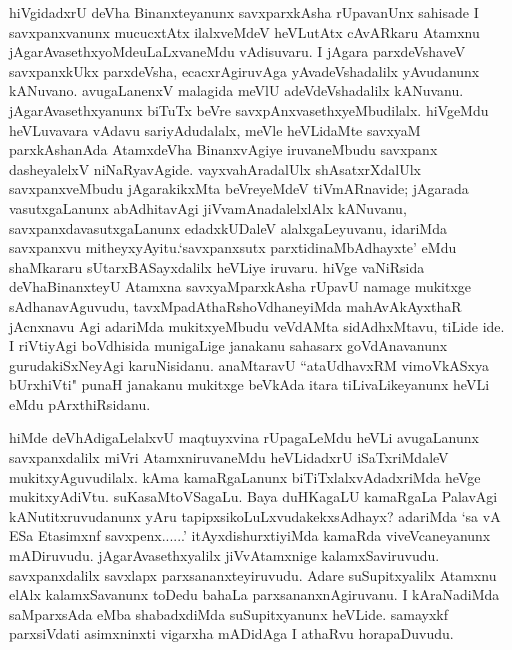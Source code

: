 \begin{artha}
hiVgidadxrU deVha Binanxteyanunx savxparxkAsha rUpavanUnx sahisade I savxpanxvanunx mucucxtAtx ilalxveMdeV heVLutAtx cAvARkaru Atamxnu jAgarAvasethxyoMdeuLaLxvaneMdu vAdisuvaru. I jAgara parxdeVshaveV savxpanxkUkx parxdeVsha, ecacxrAgiruvAga yAvadeVshadalilx yAvudanunx kANuvano. avugaLanenxV malagida meVlU adeVdeVshadalilx kANuvanu. jAgarAvasethxyanunx biTuTx beVre savxpAnxvasethxyeMbudilalx. hiVgeMdu heVLuvavara vAdavu sariyAdudalalx, meVle heVLidaMte savxyaM parxkAshanAda AtamxdeVha BinanxvAgiye iruvaneMbudu savxpanx dasheyalelxV niNaRyavAgide. vayxvahAradalUlx shAsatxrXdalUlx savxpanxveMbudu jAgarakikxMta beVreyeMdeV tiVmARnavide; jAgarada vasutxgaLanunx abAdhitavAgi jiVvamAnadalelxlAlx kANuvanu, savxpanxdavasutxgaLanunx edadxkUDaleV alalxgaLeyuvanu, idariMda savxpanxvu mitheyxyAyitu.\break `savxpanxsutx parxtidinaMbAdhayxte' eMdu shaMkararu sUtarxBASayxdalilx heVLiye iruvaru. hiVge vaNiRsida deVhaBinanxteyU Atamxna savxyaMparxkAsha rUpavU namage mukitxge sAdhanavAguvudu, tavxMpadAthaRshoVdhaneyiMda mahAvAkAyxthaR jAcnxnavu Agi adariMda mukitxyeMbudu veVdAMta sidAdhxMtavu, tiLide ide. I riVtiyAgi boVdhisida munigaLige janakanu sahasarx goVdAnavanunx gurudakiSxNeyAgi karuNisidanu. anaMtaravU ``ataUdhavxRM vimoVkASxya bUrxhiVti" punaH janakanu mukitxge beVkAda itara tiLivaLikeyanunx heVLi eMdu pArxthiRsidanu. 
\end{artha}%


\begin{artha}
hiMde deVhAdigaLelalxvU maqtuyxvina rUpagaLeMdu heVLi avugaLanunx savxpanxdalilx miVri AtamxniruvaneMdu heVLidadxrU iSaTxriMdaleV mukitxyAguvudilalx. kAma kamaRgaLanunx biTiTxlalxvAdadxriMda heVge mukitxyAdiVtu. suKasaMtoVSagaLu. Baya duHKagaLU kamaRgaLa PalavAgi kANutitxruvudanunx yAru tapipxsikoLuLxvudakekx\break sAdhayx? adariMda `sa vA ESa Etasimxnf savxpenx......' itAyxdi\break shurxtiyiMda kamaRda viveVcaneyanunx mADiruvudu. jAgarAvasethxyalilx jiVvAtamxnige kalamxSaviruvudu. savxpanxdalilx savxlapx parxsananxteyiruvudu. Adare suSupitxyalilx Atamxnu elAlx kalamxSavanunx toDedu bahaLa parxsananxnAgiruvanu. I kAraNadiMda saMparxsAda eMba shabadxdiMda suSupitxyanunx heVLide. samayxkf parxsiVdati asimxninxti vigarxha mADidAga I athaRvu horapaDuvudu. 
\end{artha}

